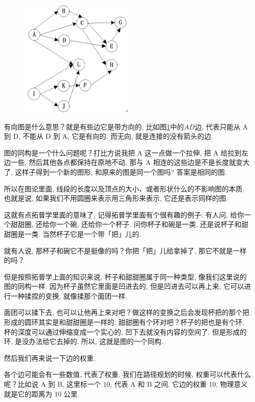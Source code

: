 \begin{figure}[ht]
  \centering
  \includegraphics[width=0.5\textwidth]{asset/ee6e89d4-03e6-450b-b886-2583b91664ab.png}
  \caption{}
  \label{fig:img6_5}
\end{figure}

有向图是什么意思？就是有些边它是带方向的, 比如图\ref{fig:img6_5}中的$AD$边, 代表只能从 A 到 D, 不能从 D 到 A, 它是有向的. 而无向, 就是连接的没有箭头的边. 

图的同构是一个什么问题呢？打比方说我把 A 这一点做一个拉伸, 把 A 给拉到左边一些, 然后其他各点都保持在原地不动, 那与 A 相连的这些边是不是长度就变大了, 这样子得到一个新的图形, 和原来的图是同一个图吗? 答案是相同的图. 

所以在图论里面, 线段的长度以及顶点的大小、或者形状什么的不影响图的本质. 也就是说, 如果我们不用圆圈来表示用三角形来表示, 它还是表示同样的图. 

这就有点拓普学里面的意味了, 记得拓普学里面有个很有趣的例子: 有人问, 给你一个甜甜圈, 还给你一个碗, 还给你一个杯子. 问你杯子和碗是一类, 还是说杯子和甜甜圈是一类. 当然杯子它是一个带「把」儿的. 

就有人说, 那杯子和碗它不是挺像的吗？你把「把」儿给拿掉了, 那它不就是一样的吗？

但是按照拓普学上面的知识来说, 杯子和甜甜圈属于同一种类型, 像我们这里说的图的同构一样. 因为杯子虽然它里面是凹进去的, 但是凹进去可以再上来, 它可以进行一种揉捏的变换, 就像揉那个面团一样. 

面团可以揉下去, 也可以让他再上来对吧？做这样的变换之后会发现杯把的那个把形成的圆环其实是和甜甜圈是一样的. 甜甜圈有个环对吧？杯子的把也是有个环. 杯的深度可以通过伸缩变成一个实心的, 凹下去就没有内容的空间了. 但是形成的环, 是没办法给它去掉的. 所以, 这就是图的一个同构. 

然后我们再来说一下边的权重. 

各个边可能会有一些数值, 代表了权重. 我们在路径规划的时候, 权重可以代表什么呢？比如说 A 到 B, 这里标一个 10, 代表 A 和 B 之间, 它边的权重 10, 物理意义就是它的距离为 10 公里. 


